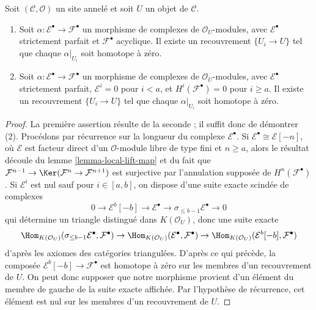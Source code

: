 \begin{lemma}
\label{lemma-local-homotopy}
Soit $(\mathcal{C}, \mathcal{O})$ un site annelé et soit $U$ un objet de
$\mathcal{C}$.
\begin{enumerate}
\item Soit $\alpha : \mathcal{E}^\bullet \to \mathcal{F}^\bullet$ un
morphisme de complexes de $\mathcal{O}_U$-modules, avec
$\mathcal{E}^\bullet$ strictement parfait et $\mathcal{F}^\bullet$ acyclique.
Il existe un recouvrement $\{U_i \to U\}$ tel que chaque
$\alpha|_{U_i}$ soit homotope à zéro.
\item Soit $\alpha : \mathcal{E}^\bullet \to \mathcal{F}^\bullet$ un
morphisme de complexes de $\mathcal{O}_U$-modules, avec
$\mathcal{E}^\bullet$ strictement parfait, $\mathcal{E}^i = 0$ pour $i < a$, et
$H^i(\mathcal{F}^\bullet) = 0$ pour $i \geq a$. Il existe un recouvrement
$\{U_i \to U\}$ tel que chaque $\alpha|_{U_i}$ soit homotope à zéro.
\end{enumerate}
\end{lemma}

\begin{proof}
La première assertion résulte de la seconde ; il suffit donc de démontrer
(2). Procédons par récurrence sur la longueur du complexe
$\mathcal{E}^\bullet$. Si
$\mathcal{E}^\bullet \cong \mathcal{E}[-n]$, où $\mathcal{E}$ est facteur
direct d'un $\mathcal{O}$-module libre de type fini et $n \geq a$, alors le
résultat découle du lemme \ref{lemma-local-lift-map} et du fait que
$\mathcal{F}^{n - 1} \to \Ker(\mathcal{F}^n \to \mathcal{F}^{n + 1})$
est surjective par l'annulation supposée de
$H^n(\mathcal{F}^\bullet)$. Si $\mathcal{E}^i$ est nul sauf pour
$i \in [a, b]$, on dispose d'une suite exacte scindée de complexes
$$
0 \to \mathcal{E}^b[-b] \to \mathcal{E}^\bullet \to
\sigma_{\leq b - 1}\mathcal{E}^\bullet \to 0
$$
qui détermine un triangle distingué dans $K(\mathcal{O}_U)$, donc une suite
exacte
$$
\Hom_{K(\mathcal{O}_U)}(
\sigma_{\leq b - 1}\mathcal{E}^\bullet, \mathcal{F}^\bullet)
\to
\Hom_{K(\mathcal{O}_U)}(\mathcal{E}^\bullet, \mathcal{F}^\bullet)
\to
\Hom_{K(\mathcal{O}_U)}(\mathcal{E}^b[-b], \mathcal{F}^\bullet)
$$
d'après les axiomes des catégories triangulées. D'après ce qui précède, la
composée $\mathcal{E}^b[-b] \to \mathcal{F}^\bullet$ est homotope à zéro sur
les membres d'un recouvrement de $U$. On peut donc supposer que notre
morphisme provient d'un élément du membre de gauche de la suite exacte
affichée. Par l'hypothèse de récurrence, cet élément est nul sur les membres
d'un recouvrement de $U$.
\end{proof}

